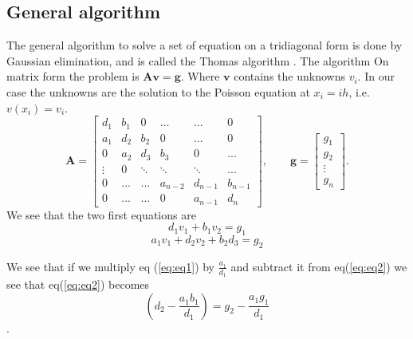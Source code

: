 \documentclass[10pt]{article}
\begin{document}
 \subsection{General algorithm}
 The general algorithm to solve a set of equation on a tridiagonal form is done by Gaussian elimination, and is called the Thomas algorithm \cite{thomas}.  The algorithm On matrix form the problem is $\mathbf{A}\mathbf{v}=\mathbf{g}$. Where $\mathbf{v}$ contains the unknowns $v_i$. In our case the unknowns are the solution to the Poisson equation at $x_i=ih$, i.e. $v(x_i)=v_i$.
 $$
 \mathbf{A}=  \begin{bmatrix}
  d_1 & b_1 & 0 & \dots & ... & 0 \\
  a_1 &d_2 & b_2 & 0 & ... & 0 \\
  0  & a_2 & d_3 & b_3 & 0 & ... \\
  \vdots & 0 & \ddots & \ddots & \ddots & ...\\
  0 & ... & ... & a_{n-2} & d_{n-1} & b_{n-1}\\
  0 & ... & ... & 0 & a_{n-1} & d_{n} 
 \end{bmatrix}, \qquad \mathbf{g}=\begin{bmatrix}
  g_1 \\ g_2 \\ \vdots \\ g_n
 \end{bmatrix}.
 $$
We see that the two first equations are 
\begin{equation}
  d_1v_1+b_1v_2=g_1
  \label{eq:eq1}
\end{equation}
\begin{equation}
  a_1v_1+d_2v_2+b_2d_3=g_2
  \label{eq:eq2}
\end{equation}

We see that if we multiply eq (\ref{eq:eq1}) by $\frac{a_1}{d_1}$ and subtract it from eq(\ref{eq:eq2}) we see that eq(\ref{eq:eq2}) becomes $$ (d_2-\frac{a_1b_1}{d_1})=g_2-\frac{a_1g_1}{d_1} $$. 
\end{document}
